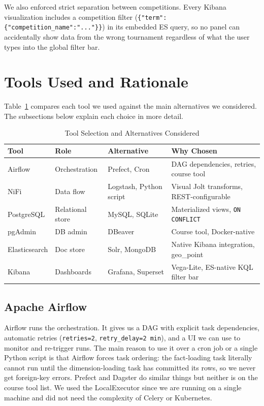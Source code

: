 \documentclass[conference]{IEEEtran}
\begin{document}
We also enforced strict separation between competitions. Every Kibana
visualization includes a competition filter
(\texttt{\{"term":\{"competition\_name":"..."\}\}}) in its embedded ES query,
so no panel can accidentally show data from the wrong tournament regardless of
what the user types into the global filter bar.


\section{Tools Used and Rationale}

Table~\ref{tab:tools} compares each tool we used against the main alternatives
we considered. The subsections below explain each choice in more detail.

\begin{table}[ht]
\caption{Tool Selection and Alternatives Considered}
\label{tab:tools}
\renewcommand{\arraystretch}{1.15}
\begin{tabular}{@{}p{1.5cm}p{1.5cm}p{1.5cm}p{2.6cm}@{}}
\toprule
\textbf{Tool} & \textbf{Role} & \textbf{Alternative} & \textbf{Why Chosen} \\
\midrule
Airflow & Orchestration & Prefect, Cron & DAG dependencies, retries, course tool \\
NiFi & Data flow & Logstash, Python script & Visual Jolt transforms, REST-configurable \\
PostgreSQL & Relational store & MySQL, SQLite & Materialized views, \texttt{ON CONFLICT} \\
pgAdmin & DB admin & DBeaver & Course tool, Docker-native \\
Elasticsearch & Doc store & Solr, MongoDB & Native Kibana integration, geo\_point \\
Kibana & Dashboards & Grafana, Superset & Vega-Lite, ES-native KQL filter bar \\
\bottomrule
\end{tabular}
\end{table}

\subsection{Apache Airflow}

Airflow runs the orchestration. It gives us a DAG with explicit task
dependencies, automatic retries (\texttt{retries=2},
\texttt{retry\_delay=2\,min}), and a UI we can use to monitor and re-trigger
runs. The main reason to use it over a cron job or a single Python script is
that Airflow forces task ordering: the fact-loading task literally cannot run
until the dimension-loading task has committed its rows, so we never get
foreign-key errors. Prefect and Dagster do similar things but neither is on
the course tool list. We used the LocalExecutor since we are running on a
single machine and did not need the complexity of Celery or Kubernetes.
\end{document}
